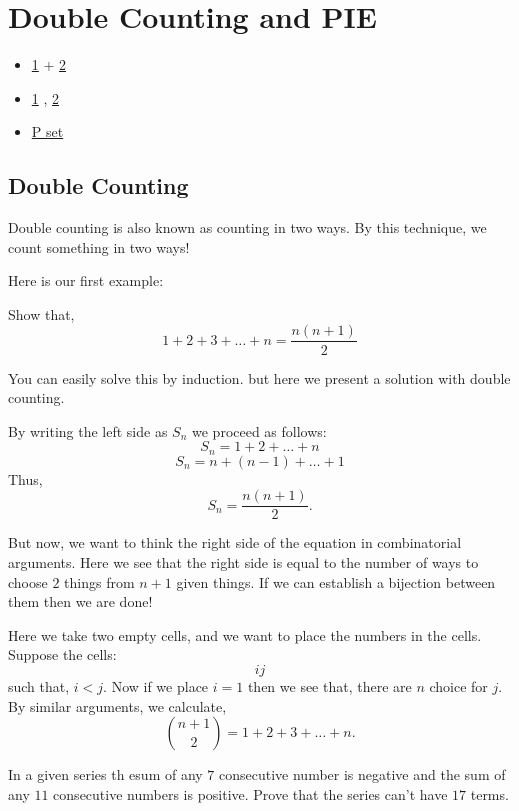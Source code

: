 \chapter{Double Counting and PIE}%

\begin{linkb}
   \begin{itemize}
        \item \href{https://www.youtube.com/watch?v=-XuswFtIiRY}{1} + \href{https://www.youtube.com/watch?v=UkvhVQ1_QEo}{2}
        \item \href{https://drive.google.com/file/d/1D-E7FSLqfIj8gYf0Dmg94uEr8pROjN-e/view}{1} , \href{https://drive.google.com/file/d/16tu7PZ_95BnBYSLIJarznwacp3deTxRF/view}{2}
        \item \href{https://drive.google.com/file/d/1FQlCRhMpyAYWvRIxWtAJGNN7kuQA3k_6/view}{P set}
   \end{itemize}
\end{linkb}

\section{Double Counting}
Double counting is also known as counting in two ways. By this technique, we count something in two ways!

Here is our first example:
\begin{example}
Show that, \[1+2+3+\ldots +n=\frac{n(n+1)}{2}\]
\end{example}
You can easily solve this by induction. but here we present a solution with double counting.

By writing the left side as $S_n$ we proceed as follows:
\[S_n = 1+2+\ldots +n\]
\[S_n = n+(n-1)+\ldots+1\]
Thus, \[S_n=\frac{n(n+1)}{2}.\]

But now, we want to think the right side of 
the equation in combinatorial arguments. 
Here we see that the right side is equal to 
the number of ways to choose $2$ things from 
$n+1$ given things. If we can establish a 
bijection between them then we are done!

Here we take two empty cells, and we want to place the numbers in the cells. 
Suppose the cells:
\[\boxed{i} \boxed{j}\]
such that, $i<j$. 
Now if we place $i=1$ then we see that, there are $n$ choice for $j$. By similar arguments, we calculate, 
\[\binom{n+1}{2}=1+2+3+\ldots+n.\]



\begin{example}
In a given series th esum of any $7$ consecutive number is negative and the sum of any $11$ consecutive numbers is positive.
Prove that the series can't have $17$ terms.
\end{example}



